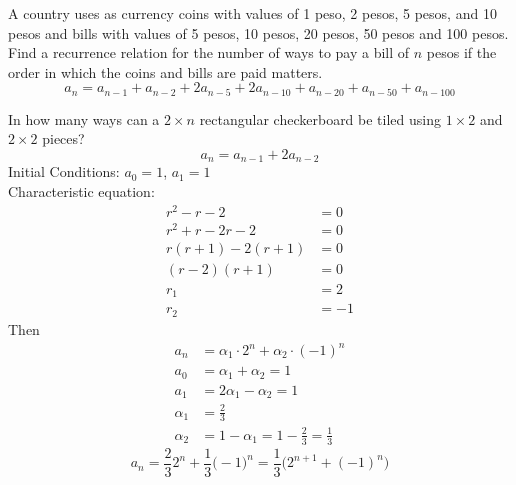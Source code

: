 \documentclass[12pt]{article}
\begin{document}
\begin{example} A country uses as currency coins with values of 1 peso, 2 pesos, 5 pesos, and 10 pesos and bills with values of 5 pesos, 10 pesos, 20 pesos, 50 pesos and 100 pesos. Find a recurrence relation for the number of ways to pay a bill of $n$ pesos if the order in which the coins and bills are paid matters. 
$$ a_n = a_{n - 1} + a_{n - 2} + 2a_{n - 5} + 2a_{n - 10} + a_{n - 20} + a_{n - 50} + a_{n - 100} $$ \end{example} 

\begin{example} In how many ways can a $2 \times n$ rectangular checkerboard be tiled using $1 \times 2$ and $2 \times 2$ pieces? $$a_n = a_{n - 1} + 2a_{n - 2} $$ 
Initial Conditions: $a_ 0 = 1$, $a_1 = 1$ \\ 
Characteristic equation: $$\begin{aligned} r^2 - r - 2 &= 0 \\ r^2 + r - 2r - 2 &= 0 \\ r(r + 1) - 2(r + 1) &= 0 \\ (r - 2)(r + 1) &= 0 \\ r_1 &= 2 \\ r_2 &= -1 \end{aligned} $$ Then $$\begin{aligned} 
a_n &= \alpha_1 \cdot 2^n + \alpha_2 \cdot (-1)^n \\ a_0 &= \alpha_1 + \alpha_2 = 1 \\ a_1 &= 2\alpha_1 - \alpha_2 = 1 \\ \alpha_1 &= \frac{2}{3} \\ \alpha_2 &= 1 - \alpha_1 = 1 - \frac{2}{3} = \frac{1}{3} \end{aligned} $$ 
$$a_n = \frac{2}{3}2^n + \frac{1}{3}\Big(-1\Big)^n = \frac{1}{3}\Big(2^{n + 1} + (-1)^n\Big) $$ \end{example} 
\end{document}
